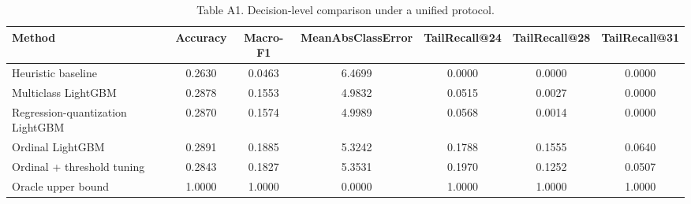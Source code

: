 \begin{table}[t]
\centering
\caption{Table A1. Decision-level comparison under a unified protocol.}
\label{tab:a1_decision}
\setlength{\tabcolsep}{4pt}
\begin{tabular}{lcccccc}
\toprule
Method & Accuracy & Macro-F1 & MeanAbsClassError & TailRecall@24 & TailRecall@28 & TailRecall@31 \\
\midrule
Heuristic baseline & 0.2630 & 0.0463 & 6.4699 & 0.0000 & 0.0000 & 0.0000 \\
Multiclass LightGBM & 0.2878 & 0.1553 & 4.9832 & 0.0515 & 0.0027 & 0.0000 \\
Regression-quantization LightGBM & 0.2870 & 0.1574 & 4.9989 & 0.0568 & 0.0014 & 0.0000 \\
Ordinal LightGBM & 0.2891 & 0.1885 & 5.3242 & 0.1788 & 0.1555 & 0.0640 \\
Ordinal + threshold tuning & 0.2843 & 0.1827 & 5.3531 & 0.1970 & 0.1252 & 0.0507 \\
Oracle upper bound & 1.0000 & 1.0000 & 0.0000 & 1.0000 & 1.0000 & 1.0000 \\
\bottomrule
\end{tabular}
\end{table}
